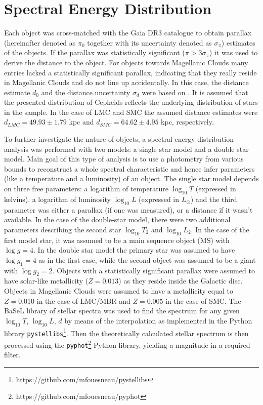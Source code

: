 \documentclass{pracalicmgr}
\begin{document}
\section{Spectral Energy Distribution}
Each object was cross-matched with the Gaia DR3 catalogue to obtain parallax (hereinafter denoted as $\pi_0$ together with its uncertainty denoted as $\sigma_{\pi}$) estimates of the objects. If the parallax was statistically significant ($\pi>3\sigma_{\pi}$)
it was used to derive the distance to the object. For objects towards Magellanic Clouds many entries lacked a statistically significant parallax, indicating that they really reside in Magellanic Clouds
and do not line up accidentally.
In this case, the distance estimate $d_0$ and the distance uncertainty $\sigma_d$ were based on \citet{jacyszyn-dobrzeniecka_ogle-ing_2016}. It is assumed that the presented distribution
of Cepheids reflects the underlying distribution of stars in the sample.
In the case of LMC and SMC the assumed distance estimates were $d_{LMC}=49.93\pm1.79$ kpc and $d_{SMC}=64.62\pm4.95$ kpc, respectively. 

To further investigate the nature of objects, a spectral energy distribution analysis was
performed with two models: a single star model and a double star model. Main goal of this type of analysis is to use a photometry from various bounds to
reconstruct a whole spectral characteristic and hence infer parameters (like a temperature and a luminosity) of an object.
The single star model depends on three free parameters: a logarithm of temperature $\log_{10}T$ (expressed in kelvins), a logarithm of luminosity $\log_{10} L$ (expressed in $L_{\odot}$) and the third
parameter was either a parallax (if one was measured), or a distance if it wasn't available. In the case of the double-star model, there were two additional parameters describing the
second star $\log_{10} T_2$ and $\log_{10} L_2$. In the case of the first model star, it was assumed to be a main sequence object (MS) with $\log{g}=4$. In the double star model the primary star
was assumed to have $\log{g_1}=4$ as in the first case, while the second object was assumed to be a giant with $\log{g_2}=2$. Objects with a statistically significant parallax were assumed to have solar-like
metallicity ($Z=0.013$) as they reside inside the Galactic disc. Objects in Magellanic Clouds
were assumed to have a metallicity equal to $Z=0.010$ in the case of LMC/MBR and $Z=0.005$ in the case of SMC.
The BaSeL library of stellar spectra \citep{lejeune_standard_1998} was used to find the spectrum for any given $\log_{10}{T}$, $\log_{10} L$, $d$ 
by means of the interpolation as implemented in the Python library
\texttt{pystellibs}\footnote{https://github.com/mfouesneau/pystellibs}.
Then the theoretically calculated stellar spectrum is then processed using the \texttt{pyphot}\footnote{https://github.com/mfouesneau/pyphot} 
Python library, yielding a magnitude in a required filter.
\end{document}
